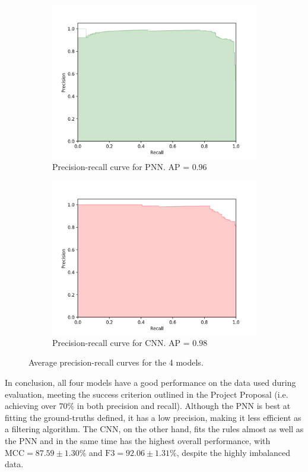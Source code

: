 \begin{figure}[H]
			\begin{subfigure}{.4\textwidth}
				\includegraphics[width=\textwidth]{graphics/precision-recall/pnn}
				\caption{Precision-recall curve for PNN. AP = $0.96$}
				\label{Fig: eval/ml/results/precision-recall/pnn}
			\end{subfigure} \hfill
			\begin{subfigure}{.4\textwidth}
				\includegraphics[width=\textwidth]{graphics/precision-recall/cnn}
				\caption{Precision-recall curve for CNN. AP = $0.98$}
				\label{Fig: eval/ml/results/precision-recall/cnn}
			\end{subfigure}
			\caption{Average precision-recall curves for the 4 models.}
			\label{Fig: eval/ml/results/precision-recall}
		\end{figure}
			In conclusion, all four models have a good performance on the data used during evaluation, meeting the success criterion outlined in the Project Proposal (i.e. achieving over $70\%$ in both precision and recall). Although the PNN is best at fitting the ground-truths defined, it has a low  precision, making it less efficient as a filtering algorithm. The CNN, on the other hand, fits the rules almost as well as the PNN and in the same time has the highest overall performance, with  $\text{MCC} = 87.59 \pm 1.30 \%$ and $\text{F3} = 92.06 \pm 1.31 \%$, despite the highly imbalanced data.
			
